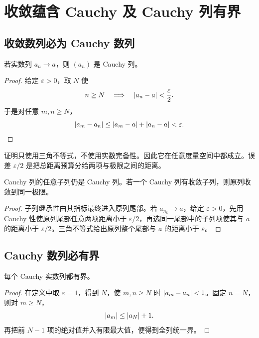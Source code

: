 \section{收敛蕴含 Cauchy 及 Cauchy 列有界}

\subsection{收敛数列必为 Cauchy 数列}


\begin{theorem}
若实数列 \(a_n\to a\)，则 \((a_n)\) 是 Cauchy 列。
\end{theorem}

\begin{proof}
给定 \(\varepsilon>0\)，取 \(N\) 使
\[
 n\ge N\quad\Longrightarrow\quad
 \left|a_n-a\right|<\frac\varepsilon2.
\]
于是对任意 \(m,n\ge N\)，
\[
 \left|a_m-a_n\right|
 \le\left|a_m-a\right|+\left|a_n-a\right|<\varepsilon.
\]
\end{proof}

证明只使用三角不等式，不使用实数完备性。因此它在任意度量空间中都成立。误差 \(\varepsilon/2\) 是把总距离预算分给两项与极限之间的距离。

\begin{corollary}
Cauchy 列的任意子列仍是 Cauchy 列。若一个 Cauchy 列有收敛子列，则原列收敛到同一极限。
\end{corollary}

\begin{proof}
子列继承性由其指标最终进入原列尾部。若 \(a_{n_k}\to a\)，给定 \(\varepsilon>0\)，先用 Cauchy 性使原列尾部任意两项距离小于 \(\varepsilon/2\)，再选同一尾部中的子列项使其与 \(a\) 的距离小于 \(\varepsilon/2\)。三角不等式给出原列整个尾部与 \(a\) 的距离小于 \(\varepsilon\)。
\end{proof}

\subsection{Cauchy 数列必有界}


\begin{theorem}
每个 Cauchy 实数列都有界。
\end{theorem}

\begin{proof}
在定义中取 \(\varepsilon=1\)，得到 \(N\)，使 \(m,n\ge N\) 时
\(\left|a_m-a_n\right|<1\)。固定 \(n=N\)，则对 \(m\ge N\)，
\[
 \left|a_m\right|\le\left|a_N\right|+1.
\]
再把前 \(N-1\) 项的绝对值并入有限最大值，便得到全列统一界。
\end{proof}

